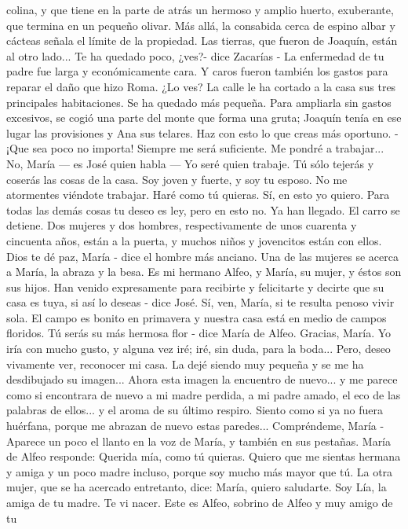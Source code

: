 \documentclass[12pt]{book} %
\begin{document}
colina, y que tiene en la parte de atrás un hermoso y amplio huerto, exuberante, que termina en un pequeño olivar. Más allá, la consabida cerca de espino albar y cácteas señala el límite de la propiedad. Las tierras, que fueron de Joaquín, están al otro lado... 
Te ha quedado poco, ¿ves?- dice Zacarías - La enfermedad de tu padre fue larga y económicamente cara. Y caros fueron también los gastos para reparar el daño que hizo Roma. ¿Lo ves? La calle le ha cortado a la casa sus tres principales habitaciones. Se ha quedado más pequeña. Para ampliarla sin gastos excesivos, se cogió una parte del monte que forma una gruta; Joaquín tenía en ese lugar las provisiones y Ana sus telares. Haz con esto lo que creas más oportuno. 
-¡Que sea poco no importa! Siempre me será suficiente. Me pondré a trabajar... 
No, María — es José quien habla — Yo seré quien trabaje. Tú sólo tejerás y coserás las cosas de la casa. Soy joven y 
fuerte, y soy tu esposo. No me atormentes viéndote trabajar. 
Haré como tú quieras. 
Sí, en esto yo quiero. Para todas las demás cosas tu deseo es ley, pero en esto no. 
Ya han llegado. El carro se detiene. 
Dos mujeres y dos hombres, respectivamente de unos cuarenta y cincuenta años, están a la puerta, y muchos niños y 
jovencitos están con ellos. 
Dios te dé paz, María - dice el hombre más anciano. Una de las mujeres se acerca a María, la abraza y la besa. 
Es mi hermano Alfeo, y María, su mujer, y éstos son sus hijos. Han venido expresamente para recibirte y felicitarte y 
decirte que su casa es tuya, si así lo deseas - dice José. 
Sí, ven, María, si te resulta penoso vivir sola. El campo es bonito en primavera y nuestra casa está en medio de campos 
floridos. Tú serás su más hermosa flor - dice María de Alfeo. 
Gracias, María. Yo iría con mucho gusto, y alguna vez iré; iré, sin duda, para la boda... Pero, deseo vivamente ver, reconocer mi casa. La dejé siendo muy pequeña y se me ha desdibujado su imagen... Ahora esta imagen la encuentro de nuevo... y me parece como si encontrara de nuevo a mi madre perdida, a mi padre amado, el eco de las palabras de ellos... y el aroma de su último respiro. Siento como si ya no fuera huérfana, porque me abrazan de nuevo estas paredes... Compréndeme, María - Aparece un poco el llanto en la voz de María, y también en sus pestañas. María de Alfeo responde: 
Querida mía, como tú quieras. Quiero que me sientas hermana y amiga y un poco madre incluso, porque soy mucho más mayor que tú. 
La otra mujer, que se ha acercado entretanto, dice: 
María, quiero saludarte. Soy Lía, la amiga de tu madre. Te vi nacer. Este es Alfeo, sobrino de Alfeo y muy amigo de tu 
\end{document}
